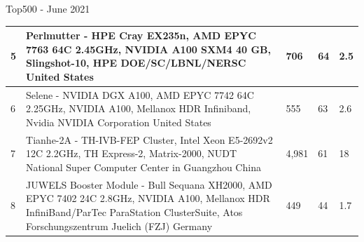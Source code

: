\documentclass{beamer}
\begin{document}

\begin{frame}{Top500 - June 2021}
	\begin{table}
		\centering %
\small		
                \begin{tabular}{p{0.1cm} p{8cm} p{0.7cm} p{0.5cm} p{0.5cm}}
			 5 &    Perlmutter - HPE Cray EX235n, AMD EPYC 7763 64C 2.45GHz, NVIDIA A100 SXM4 40 GB, Slingshot-10, HPE DOE/SC/LBNL/NERSC United States    & 706 & 64 &2.5\\
			\midrule
                            6 &  Selene - NVIDIA DGX A100, AMD EPYC 7742 64C 2.25GHz, NVIDIA A100, Mellanox HDR Infiniband, Nvidia NVIDIA Corporation United States & 555 & 63 & 2.6 \\
			\midrule
                            7 &   Tianhe-2A - TH-IVB-FEP Cluster, Intel Xeon E5-2692v2 12C 2.2GHz, TH Express-2, Matrix-2000, NUDT National Super Computer Center in Guangzhou China & 4,981 & 61 & 18 \\
			\midrule
                            8 &   JUWELS Booster Module - Bull Sequana XH2000, AMD EPYC 7402 24C 2.8GHz, NVIDIA A100, Mellanox HDR InfiniBand/ParTec ParaStation ClusterSuite, Atos Forschungszentrum Juelich (FZJ) Germany  & 449 & 44 & 1.7 \\
			
		\end{tabular}
	\end{table}
\end{frame}

\end{document}
